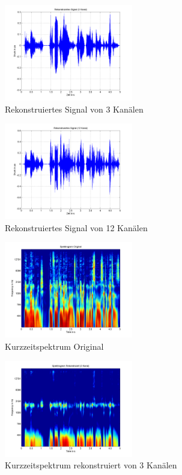 \documentclass[conference]{IEEEtran}
\begin{document}
\begin{figure}[h]
	\centering
	\includegraphics[width=0.5\textwidth]{img/sig_rec_3.png}
	\caption{Rekonstruiertes Signal von 3 Kanälen}
	\label{fig:sig-rec-3}
\end{figure}

\begin{figure}[h]
	\centering
	\includegraphics[width=0.5\textwidth]{img/sig_rec_12.png}
	\caption{Rekonstruiertes Signal von 12 Kanälen}
	\label{fig:sig-rec-12}
\end{figure}

\begin{figure}[h]
	\centering
	\includegraphics[width=0.5\textwidth]{img/spect_orig.png}
	\caption{Kurzzeitspektrum Original}
	\label{fig:spect-orig}
\end{figure}

\begin{figure}[h]
	\centering
	\includegraphics[width=0.5\textwidth]{img/spect_rec_3.png}
	\caption{Kurzzeitspektrum rekonstruiert von 3 Kanälen}
	\label{fig:spect-rec-3}
\end{figure}
\end{document}
